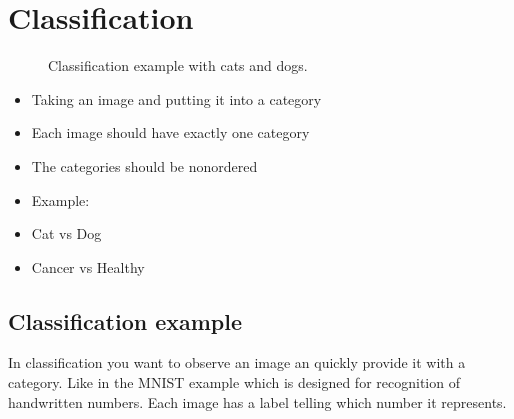 \documentclass[letterpaper,10pt,english]{sphinxmanual}
\begin{document}
\section{Classification}
\label{\detokenize{03-Datasets:classification}}
\begin{figure}[htbp]
\centering
\capstart

\noindent{}
\caption{Classification example with cats and dogs.}\label{\detokenize{03-Datasets:id11}}\end{figure}
\begin{itemize}
\item {} 
\sphinxAtStartPar
Taking an image and putting it into a category

\item {} 
\sphinxAtStartPar
Each image should have exactly one category

\item {} 
\sphinxAtStartPar
The categories should be non\sphinxhyphen{}ordered

\item {} 
\sphinxAtStartPar
Example:

\item {} 
\sphinxAtStartPar
Cat vs Dog

\item {} 
\sphinxAtStartPar
Cancer vs Healthy

\end{itemize}




\subsection{Classification example}
\label{\detokenize{03-Datasets:classification-example}}
\sphinxAtStartPar
In classification you want to observe an image an quickly provide it with a category. Like in the MNIST example which is designed for recognition of handwritten numbers. Each image has a label telling which number it represents.
\end{document}
